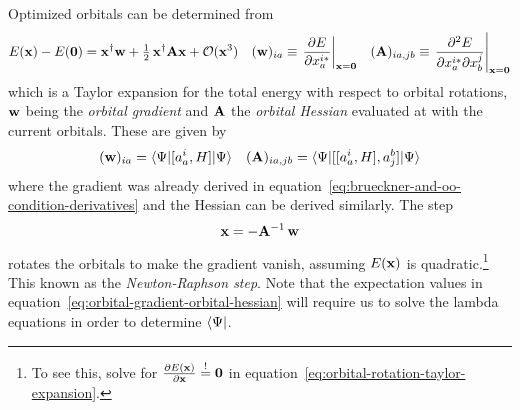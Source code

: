 \documentclass[11pt]{article}
\numberwithin{equation}{section}
\begin{document}
\begin{rmk}
\label{rmk:orbital-newton-raphson}
Optimized orbitals can be determined from
\begin{align}
\label{eq:orbital-rotation-taylor-expansion}
  E(\mathbf{x})
-
  E(\mathbf{0})
=
  \mathbf{x}^\dagger
  \mathbf{w}
+
  \tfrac{1}{2}\,
  \mathbf{x}^\dagger
  \mathbf{A}
  \mathbf{x}
+
  \mathcal{O}(\mathbf{x}^3)
&&
  (\mathbf{w})_{ia}
\equiv
  \left.
  \frac {\partial E}{\partial x_a^{i*}}
  \right|_{\mathbf{x}=\mathbf{0}}
&&
  (\mathbf{A})_{ia,jb}
\equiv
  \left.
  \frac {\partial^2 E}{\partial x_a^{i*}\partial x_b^j}
  \right|_{\mathbf{x}=\mathbf{0}}
\end{align}
which is a Taylor expansion for the total energy with respect to orbital rotations, $\mathbf{w}$ being the \textit{orbital gradient} and $\mathbf{A}$ the \textit{orbital Hessian} evaluated at with the current orbitals.
These are given by
\begin{align}
\label{eq:orbital-gradient-orbital-hessian}
  (\mathbf{w})_{ia}
=
  \langle\Psi |
    [a^i_a, H]
  |\Psi \rangle
&&
  (\mathbf{A})_{ia,jb}
=
  \langle\Psi |
    [[a^i_a, H], a^b_j]
  |\Psi \rangle
\end{align}
where the gradient was already derived in equation~\ref{eq:brueckner-and-oo-condition-derivatives} and the Hessian can be derived similarly.
The step
\begin{align}
  \mathbf{x}
=
-
  \mathbf{A}^{-1}\,
  \mathbf{w}
\end{align}
rotates the orbitals to make the gradient vanish, assuming $E(\mathbf{x})$ is quadratic.\footnote{To see this, solve for $\frac {\partial E(\mathbf{x})}{\partial\mathbf{x}}\overset{!}{=}\mathbf{0}$ in equation~\ref{eq:orbital-rotation-taylor-expansion}.}
This known as the \textit{Newton-Raphson step}.
Note that the expectation values in equation~\ref{eq:orbital-gradient-orbital-hessian} will require us to solve the lambda equations in order to determine $\langle\Psi |$.
\end{rmk}
\end{document}

